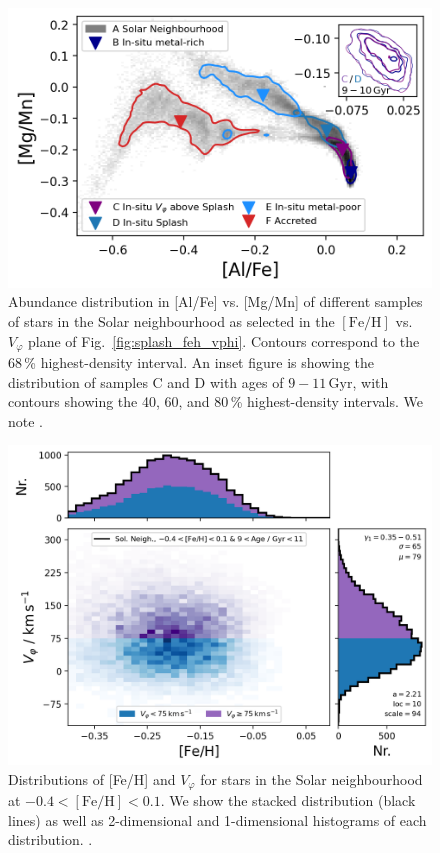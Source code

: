 \documentclass[fleqn,usenatbib]{mnras}
\begin{document}
\begin{figure}
    \centering
    \includegraphics[width=0.9\columnwidth]{figures/splash_alfe_mgmn.png}
    \caption{Abundance distribution in [Al/Fe] vs. [Mg/Mn] of different samples of stars in the Solar neighbourhood as selected in the $\mathrm{[Fe/H]}$ vs. $V_\varphi$ plane of Fig.~\ref{fig:splash_feh_vphi}. Contours correspond to the 68\,\% highest-density interval. An inset figure is showing the distribution of samples C and D with ages of $9-11\,\mathrm{Gyr}$, with contours showing the 40, 60, and 80\,\% highest-density intervals. We note  \href{https://github.com/svenbuder/gse_nihaouhd/tree/main/figures}{\faGithub}.}
    \label{fig:splash_alfe_mgmn}
\end{figure}

\begin{figure}
    \centering
    \includegraphics[width=0.9\columnwidth]{figures/splash_vphi_distribution.png}
    \caption{Distributions of [Fe/H] and $V_\varphi$ for stars in the Solar neighbourhood at $-0.4 < \mathrm{[Fe/H]} < 0.1$. We show the stacked distribution (black lines) as well as 2-dimensional and 1-dimensional histograms of each distribution.
    \href{https://github.com/svenbuder/gse_nihaouhd/tree/main/figures}{\faGithub}.}
    \label{fig:splash_vphi_distribution}
\end{figure}
\end{document}
